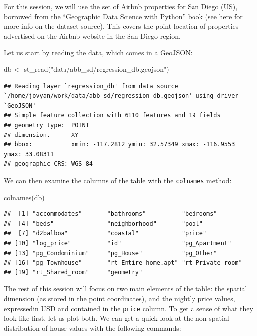 \documentclass[
]{book}
\newenvironment{Shaded}{\begin{snugshade}}{\end{snugshade}}
\newcommand{\FunctionTok}[1]{\textcolor[rgb]{0.00,0.00,0.00}{#1}}
\newcommand{\NormalTok}[1]{#1}
\newcommand{\OtherTok}[1]{\textcolor[rgb]{0.56,0.35,0.01}{#1}}
\newcommand{\StringTok}[1]{\textcolor[rgb]{0.31,0.60,0.02}{#1}}
\begin{document}
For this session, we will use the set of Airbnb properties for San Diego (US), borrowed from the ``Geographic Data Science with Python'' book (see \href{https://geographicdata.science/book/data/airbnb/regression_cleaning.html}{here} for more info on the dataset source). This covers the point location of properties advertised on the Airbnb website in the San Diego region.

Let us start by reading the data, which comes in a GeoJSON:

\begin{Shaded}
\begin{Highlighting}[]
\NormalTok{db }\OtherTok{\textless{}{-}} \FunctionTok{st\_read}\NormalTok{(}\StringTok{"data/abb\_sd/regression\_db.geojson"}\NormalTok{)}
\end{Highlighting}
\end{Shaded}

\begin{verbatim}
## Reading layer `regression_db' from data source `/home/jovyan/work/data/abb_sd/regression_db.geojson' using driver `GeoJSON'
## Simple feature collection with 6110 features and 19 fields
## geometry type:  POINT
## dimension:      XY
## bbox:           xmin: -117.2812 ymin: 32.57349 xmax: -116.9553 ymax: 33.08311
## geographic CRS: WGS 84
\end{verbatim}

We can then examine the columns of the table with the \texttt{colnames} method:

\begin{Shaded}
\begin{Highlighting}[]
\FunctionTok{colnames}\NormalTok{(db)}
\end{Highlighting}
\end{Shaded}

\begin{verbatim}
##  [1] "accommodates"       "bathrooms"          "bedrooms"          
##  [4] "beds"               "neighborhood"       "pool"              
##  [7] "d2balboa"           "coastal"            "price"             
## [10] "log_price"          "id"                 "pg_Apartment"      
## [13] "pg_Condominium"     "pg_House"           "pg_Other"          
## [16] "pg_Townhouse"       "rt_Entire_home.apt" "rt_Private_room"   
## [19] "rt_Shared_room"     "geometry"
\end{verbatim}

The rest of this session will focus on two main elements of the table: the spatial dimension (as stored in the point coordinates), and the nightly price values, expressedin USD and contained in the \texttt{price} column. To get a sense of what they look like first, let us plot both. We can get a quick look at the non-spatial distribution of house values with the following commands:
\end{document}
